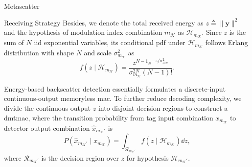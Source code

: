 \documentclass[journal]{IEEEtran}
\begin{document}
\begin{section}{Metascatter}
\begin{subsection}{Receiving Strategy}
		Besides, we denote the total received energy as $z \triangleq \lVert \boldsymbol{y} \rVert^2$ and the hypothesis of modulation index combination $m_{\mathcal{K}}$ as $\mathcal{H}_{m_{\mathcal{K}}}$.
		Since $z$ is the sum of $N$ \gls{iid} exponential variables, its conditional \gls{pdf} under $\mathcal{H}_{m_{\mathcal{K}}}$ follows Erlang distribution with shape $N$ and scale $\sigma_{m_{\mathcal{K}}}^2$ as
		\begin{equation}
			f(z \mid \mathcal{H}_{m_{\mathcal{K}}}) = \frac{z^{N-1} e^{-z/\sigma_{m_{\mathcal{K}}}^2}}{\sigma_{m_{\mathcal{K}}}^{2N} (N-1)!}.
			\label{eq:energy_distribution}
		\end{equation}

		Energy-based backscatter detection essentially formulates a discrete-input continuous-output memoryless \gls{mac}.
		To further reduce decoding complexity, we divide the continuous output $z$ into disjoint decision regions to construct a \gls{dmtmac}, where the transition probability from tag input combination $x_{m_{\mathcal{K}}}$ to detector output combination $\hat{x}_{m_{\mathcal{K}}'}$ is
		\begin{equation}
			P(\hat{x}_{m_{\mathcal{K}}'} \mid x_{m_{\mathcal{K}}}) = \int_{\mathcal{R}_{m_{\mathcal{K}}'}} f(z \mid \mathcal{H}_{m_{\mathcal{K}}}) \dd z,
			\label{eq:dmtmac}
		\end{equation}
		where $\mathcal{R}_{m_{\mathcal{K}}'}$ is the decision region over $z$ for hypothesis $\mathcal{H}_{m_{\mathcal{K}}'}$.
	\end{subsection}


\end{section}
\end{document}
